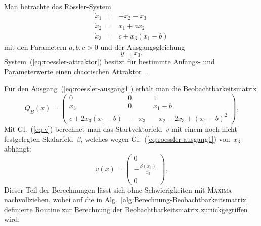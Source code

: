 \begin{example}
\label{exa:Roessler-Krener-Isidori}Man betrachte das Rössler-System~\cite{roessler76,roessler79}
\begin{equation}
\begin{array}{lcl}
\dot{x}_{1} & = & -x_{2}-x_{3}\\
\dot{x}_{2} & = & x_{1}+ax_{2}\\
\dot{x}_{3} & = & c+x_{3}(x_{1}-b)
\end{array}\label{eq:roessler-attraktor}
\end{equation}
mit den Parametern $a,b,c>0$ und der Ausgangsgleichung 
\begin{equation}
y=x_{3}.\label{eq:roessler-ausgang1}
\end{equation}
System~(\ref{eq:roessler-attraktor}) besitzt für bestimmte Anfangs-
und Parameterwerte einen chaotischen Attraktor~\cite{jetschke89,arrowsmith90}.

Für den Ausgang~(\ref{eq:roessler-ausgang1}) erhält man die Beobachtbarkeitsmatrix
\[
Q_{B}(x)=\left(\begin{array}{ccc}
0 & 0 & 1\\
x_{3} & 0 & x_{1}-b\\
c+2x_{3}(x_{1}-b) & \;-x_{3}\; & -x_{2}-2x_{3}+(x_{1}-b)^{2}
\end{array}\right).
\]
Mit Gl.~(\ref{eq:v}) berechnet man das Startvektorfeld~$v$ mit
einem noch nicht festgelegten Skalarfeld~$\beta$, welches wegen
Gl.~(\ref{eq:roessler-ausgang1}) von~$x_{3}$ abhängt:
\[
v(x)=\left(\begin{array}{c}
0\\
-\frac{\beta(x_{3})}{x_{3}}\\
0
\end{array}\right).
\]
Dieser Teil der Berechnungen lässt sich ohne Schwierigkeiten mit \textsc{Maxima}
nachvollziehen, wobei auf die in Alg.~\ref{alg:Berechnung-Beobachtbarkeitsmatrix}
definierte Routine zur Berechnung der Beobachtbarkeitsmatrix zurückgegriffen
wird:

\begin{maxima}\end{maxima}


\end{example}
